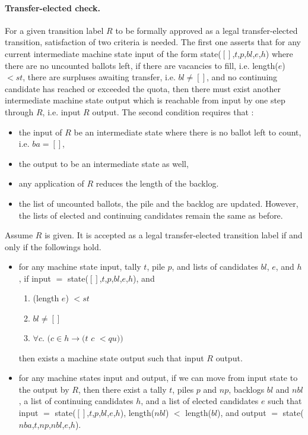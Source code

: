 \documentclass{llncs}
\begin{document}
\paragraph{Transfer-elected check.} For a given transition label $R$ to be formally approved as a legal transfer-elected transition, satisfaction of two criteria is needed. The first one asserts that for any current intermediate machine state \textsf{input} 
 of the form \textsf{state}($[]$,$t$,$p$,$bl$,$e$,$h$) where there are no uncounted ballots left, if there are vacancies to fill, i.e. \textsf{length}($e$) $< st$, there are surpluses awaiting transfer, i.e. $bl \neq []$, and no continuing candidate has reached or exceeded the quota, then there must exist another intermediate machine state \textsf{output} which is reachable from \textsf{input} by one step through $R$, i.e. \textsf{input} $R$ \textsf{output}. The second condition requires that : 
\begin{itemize} 
\item the input of $R$ be an intermediate state where there is no ballot left to count, i.e. $ba = []$, 
\item the output to be an intermediate state as well, 
\item any application of $R$ reduces  the length of the backlog. 
\item the list of uncounted ballots, the pile and the backlog are updated. However, the lists of elected and continuing candidates remain the same as before.
 \end{itemize} 
\begin{definition}\label{trans:check}
Assume $R$ is given. It is accepted as a legal transfer-elected transition label if and only if the followings hold. 
\begin{itemize}
\item for any machine state \textsf{input}, tally $t$, pile $p$, and lists of candidates $bl$, $e$, and $h$, if  \textsf{input} $=$ \textsf{state}($[]$,$t$,$p$,$bl$,$e$,$h$), and
\begin{enumerate}
\item (\textsf{length} $e$) $< st$ 
\item $bl \neq []$
\item $\forall c.$ $(c \in h \rightarrow (t$ $c$ $< qu))$ 
\end{enumerate}  
then exists a machine state \textsf{output} such that \textsf{input} $R$ \textsf{output}.
\item for any machine states \textsf{input} and \textsf{output}, if we can move from \textsf{input} state to the \textsf{output} by $R$, then there exist a tally $t$, piles $p$ and $np$, backlogs $bl$ and $nbl$, a list of continuing candidates $h$, and a list of elected candidates $e$ such that \textsf{input} $=$ \textsf{state}($[]$,$t$,$p$,$bl$,$e$,$h$), \textsf{length}($nbl$) $<$ \textsf{length}($bl$), and \textsf{output} $=$ \textsf{state}($nba$,$t$,$np$,$nbl$,$e$,$h$).
\end{itemize}
\end{definition}
\end{document}
